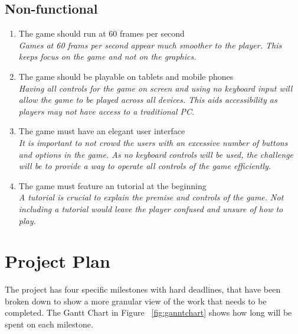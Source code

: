 \documentclass[12pt,a4paper]{report}
\begin{document}
   \section{Non-functional}
   \begin{enumerate}[label*=\thesection.\arabic*]
            \item The game should run at 60 frames per second\\
            \textit{Games at 60 frams per second appear much smoother to the player. This keeps focus on the game and not on the graphics.}
            \item The game should be playable on tablets and mobile phones\\
            \textit{Having all controls for the game on screen and using no keyboard input will allow the game to be played across all devices. This aids accessibility as players may not have access to a traditional PC.}
            \item The game must have an elegant user interface\\
            \textit{It is important to not crowd the users with an excessive number of buttons and options in the game. As no keyboard controls will be used, the challenge will be to provide a way to operate all controls of the game efficiently.}
             \item The game must feature an tutorial at the beginning\\
            \textit{A tutorial is crucial to explain the premise and controls of the game. Not including a tutorial would leave the player confused and unsure of how to play. }
        \end{enumerate}



{\let\clearpage\relax \chapter{Project Plan}}
The project has four specific milestones with hard deadlines, that have been broken down to show a more granular view of the work that needs to be completed. The Gantt Chart in Figure ~\ref{fig:ganntchart} shows how long will be spent on each milestone.
\end{document}
